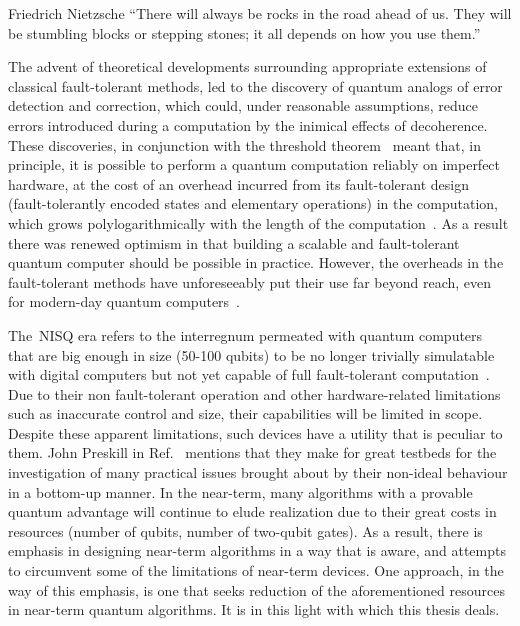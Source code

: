 \bigskip
\begin{epigram}{Friedrich Nietzsche}
\noindent \enquote{There will always be rocks in the road ahead of us. They will be stumbling blocks or stepping stones; it all depends on how you use them.}
\end{epigram}

\bigskip
\noindent
The advent of theoretical developments surrounding appropriate extensions of classical fault-tolerant methods, led to the discovery of quantum analogs of error detection and correction, which could, under reasonable assumptions, reduce errors introduced during a computation by the inimical effects of decoherence. These discoveries, in conjunction with the threshold theorem~\cite{Aharonov_Or_1997,Shor_1996} meant that, in principle, it is possible to perform a quantum computation reliably on imperfect hardware, at the cost of an overhead incurred from its fault-tolerant design (fault-tolerantly encoded states and elementary operations) in the computation, which grows polylogarithmically with the length of the computation~\cite{gottesman_2009}. As a result there was renewed optimism in that building a scalable and fault-tolerant quantum computer should be possible in practice. However, the overheads in the fault-tolerant methods have unforeseeably put their use far beyond reach, even for modern-day quantum computers~\cite{Preskill_2018}.

\bigskip
\noindent
The~\gls{NISQ} era refers to the interregnum permeated with quantum computers that are big enough in size (50-100 qubits) to be no longer trivially simulatable with digital computers but not yet capable of full fault-tolerant computation~\cite{Preskill_2018}. Due to their non fault-tolerant operation and other hardware-related limitations such as inaccurate control and size, their capabilities will be limited in scope. Despite these apparent limitations, such devices have a utility that is peculiar to them. John Preskill in Ref.~\cite{Preskill_2018} mentions that they make for great testbeds for the investigation of many practical issues brought about by their non-ideal behaviour in a bottom-up manner. In the near-term, many algorithms with a provable quantum advantage will continue to elude realization due to their great costs in resources (number of qubits, number of two-qubit gates). As a result, there is emphasis in designing near-term algorithms in a way that is aware, and attempts to circumvent some of the limitations of near-term devices. One approach, in the way of this emphasis, is one that seeks reduction of the aforementioned resources in near-term quantum algorithms. It is in this light with which this thesis deals.

